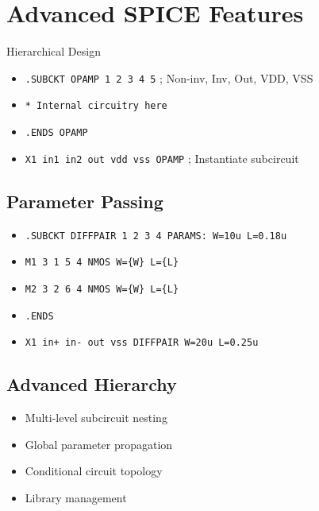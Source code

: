 \documentclass{beamer}
\begin{document}
\section{Advanced SPICE Features}

\begin{frame}{Hierarchical Design}
    \begin{itemize}
        \item \texttt{.SUBCKT OPAMP 1 2 3 4 5} ; Non-inv, Inv, Out, VDD, VSS
        \item \texttt{* Internal circuitry here}
        \item \texttt{.ENDS OPAMP}
        \item \texttt{X1 in1 in2 out vdd vss OPAMP} ; Instantiate subcircuit
    \end{itemize}
    
    \subsection{Parameter Passing}
    \begin{itemize}
        \item \texttt{.SUBCKT DIFFPAIR 1 2 3 4 PARAMS: W=10u L=0.18u}
        \item \texttt{M1 3 1 5 4 NMOS W=\{W\} L=\{L\}}
        \item \texttt{M2 3 2 6 4 NMOS W=\{W\} L=\{L\}}
        \item \texttt{.ENDS}
        \item \texttt{X1 in+ in- out vss DIFFPAIR W=20u L=0.25u}
    \end{itemize}
    
    \subsection{Advanced Hierarchy}
    \begin{itemize}
        \item Multi-level subcircuit nesting
        \item Global parameter propagation
        \item Conditional circuit topology
        \item Library management
    \end{itemize}
\end{frame}
\end{document}
